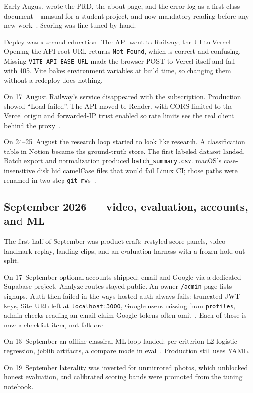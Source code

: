 \documentclass[11pt,a4paper]{article}
\newcommand{\code}[1]{\texttt{#1}}
\begin{document}
Early August wrote the PRD, the about page, and the error log as a first-class document---unusual for a student project, and now mandatory reading before any new work~\cite{errors}.
Scoring was fine-tuned by hand.

Deploy was a second education.
The API went to Railway; the UI to Vercel.
Opening the API root URL returns \texttt{Not Found}, which is correct and confusing.
Missing \code{VITE\_API\_BASE\_URL} made the browser POST to Vercel itself and fail with 405.
Vite bakes environment variables at build time, so changing them without a redeploy does nothing.

On 17~August Railway's service disappeared with the subscription.
Production showed \enquote{Load failed}.
The API moved to Render, with CORS limited to the Vercel origin and forwarded-IP trust enabled so rate limits see the real client behind the proxy~\cite{deploy}.

On 24--25~August the research loop started to look like research.
A classification table in Notion became the ground-truth store.
The first labeled dataset landed.
Batch export and normalization produced \code{batch\_summary.csv}.
macOS's case-insensitive disk hid camelCase files that would fail Linux CI; those paths were renamed in two-step \code{git mv}s~\cite{errors}.

\subsection{September 2026 --- video, evaluation, accounts, and ML}

The first half of September was product craft: restyled score panels, video landmark replay, landing clips, and an evaluation harness with a frozen hold-out split.

On 17~September optional accounts shipped: email and Google via a dedicated Supabase project.
Analyze routes stayed public.
An owner \code{/admin} page lists signups.
Auth then failed in the ways hosted auth always fails: truncated JWT keys, Site URL left at \code{localhost:3000}, Google users missing from \code{profiles}, admin checks reading an email claim Google tokens often omit~\cite{errors}.
Each of those is now a checklist item, not folklore.

On 18~September an offline classical ML loop landed: per-criterion L2 logistic regression, joblib artifacts, a compare mode in eval~\cite{mllogistic}.
Production still uses YAML.

On 19~September laterality was inverted for unmirrored photos, which unblocked honest evaluation, and calibrated scoring bands were promoted from the tuning notebook.
\end{document}
